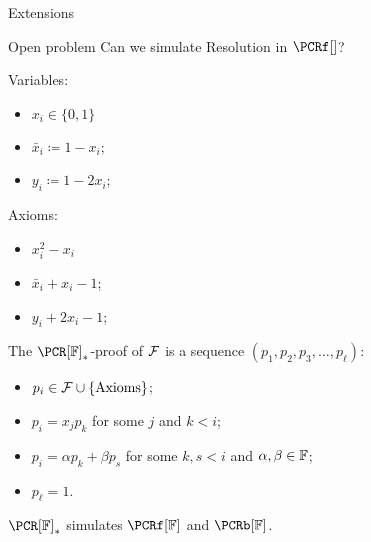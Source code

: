 \begin{frame}{Extensions}

    \pause
    \begin{block}{Open problem}
        Can we simulate Resolution in $\PCRf[]$?
    \end{block}

    \pause

    \begin{minipage}{0.48\linewidth}
        Variables:
        \begin{itemize}
            \item $x_i \in \{0, 1\}$
            \item $\bar{x}_i \coloneqq 1 - x_i$;
            \item $y_i \coloneqq 1 - 2 x_i$;
        \end{itemize}
    \end{minipage}
    \begin{minipage}{0.48\linewidth}
        Axioms:
        \begin{itemize}
            \item $x^2_i - x_i$
            \item $\bar{x}_i + x_i - 1$;
            \item $y_i + 2 x_i - 1$;
        \end{itemize}
    \end{minipage}

    \vspace{0.4cm}
    \pause

    The $\PCR[\field]_*$-proof of $\mathcal{F}$ is a sequence $(p_1, p_2, p_3, \dots, p_{\ell})$:
    \pause
    \begin{itemize}
        \item $p_i \in \mathcal{F} \cup \{\text{Axioms}\}$;
        \pause
        \item $p_i = x_j p_k$ for some $j$ and $k < i$;
        \pause    
        \item $p_i = \alpha p_k + \beta p_s$ for some $k, s < i$ and $\alpha, \beta \in \mathbb{F}$;
        \pause
            \item $p_{\ell} = 1$.
    \end{itemize}

    \pause
    
    $\PCR[\field]_*$ simulates $\PCRf[\field]$ and $\PCRb[\field]$.
\end{frame}


